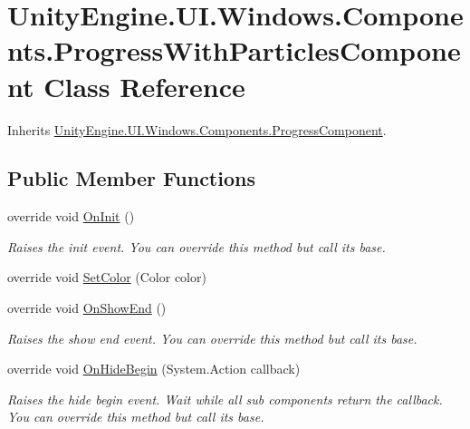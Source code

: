 \hypertarget{class_unity_engine_1_1_u_i_1_1_windows_1_1_components_1_1_progress_with_particles_component}{}\section{Unity\+Engine.\+U\+I.\+Windows.\+Components.\+Progress\+With\+Particles\+Component Class Reference}
\label{class_unity_engine_1_1_u_i_1_1_windows_1_1_components_1_1_progress_with_particles_component}


Inherits \hyperlink{class_unity_engine_1_1_u_i_1_1_windows_1_1_components_1_1_progress_component}{Unity\+Engine.\+U\+I.\+Windows.\+Components.\+Progress\+Component}.

\subsection*{Public Member Functions}
\begin{DoxyCompactItemize}
\item 
override void \hyperlink{class_unity_engine_1_1_u_i_1_1_windows_1_1_components_1_1_progress_with_particles_component_a695aed65b8ae5dc7d929f3d8a6e1a71c}{On\+Init} ()
\begin{DoxyCompactList}\small\item\em Raises the init event. You can override this method but call it\textquotesingle{}s base. \end{DoxyCompactList}\item 
override void \hyperlink{class_unity_engine_1_1_u_i_1_1_windows_1_1_components_1_1_progress_with_particles_component_a67290737e0394995ebf2568cf647b35a}{Set\+Color} (Color color)
\item 
override void \hyperlink{class_unity_engine_1_1_u_i_1_1_windows_1_1_components_1_1_progress_with_particles_component_ae98d77007cefaafc7f19977c8c52f937}{On\+Show\+End} ()
\begin{DoxyCompactList}\small\item\em Raises the show end event. You can override this method but call it\textquotesingle{}s base. \end{DoxyCompactList}\item 
override void \hyperlink{class_unity_engine_1_1_u_i_1_1_windows_1_1_components_1_1_progress_with_particles_component_aa1d51df4e80e88cdfff29587710d3846}{On\+Hide\+Begin} (System.\+Action callback)
\begin{DoxyCompactList}\small\item\em Raises the hide begin event. Wait while all sub components return the callback. You can override this method but call it\textquotesingle{}s base. \end{DoxyCompactList}\end{DoxyCompactItemize}
